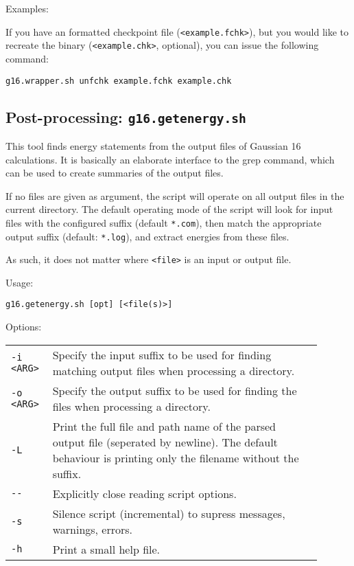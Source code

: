\documentclass[   %
  final,          %
  a4paper         %
]{article}
\begin{document}
Examples:

If you have an formatted checkpoint file (\lstinline`<example.fchk>`), 
but you would like to recreate the binary (\lstinline`<example.chk>`, optional),
you can issue the following command:

\lstinline`g16.wrapper.sh unfchk example.fchk example.chk` 

\subsection{Post-processing: \texorpdfstring{{\lstinline`g16.getenergy.sh`}}{g16.getenergy.sh}}
\label{sec:g16.getenergy}

This tool finds energy statements from the output files of Gaussian 16 calculations.
It is basically an elaborate interface to the grep command, 
which can be used to create summaries of the output files.

If no files are given as argument, the script will operate on all output files in the current directory.
The default operating mode of the script will look for input files with the configured suffix (default \texttt{*.com}),
then match the appropriate output suffix (default: \texttt{*.log}),
and extract energies from these files.

As such, it does not matter where \lstinline`<file>` is an input or output file.

Usage: 

\lstinline`g16.getenergy.sh [opt] [<file(s)>]`

Options: 

\begin{tabular}{p{0.1\linewidth}p{0.8\linewidth}}
  {\lstinline`-i <ARG>`} & Specify the input suffix to be used for finding matching output files when processing a directory. \\
  {\lstinline`-o <ARG>`} & Specify the output suffix to be used for finding the files when processing a directory. \\
  {\lstinline`-L`}       & Print the full file and path name of the parsed output file (seperated by newline). 
    The default behaviour is printing only the filename without the suffix. \\
  {\lstinline`--`}       & Explicitly close reading script options. \\
  {\lstinline`-s`}       & Silence script (incremental) to supress messages, warnings, errors. \\
  {\lstinline`-h`}       & Print a small help file. \\
\end{tabular}
\end{document}
